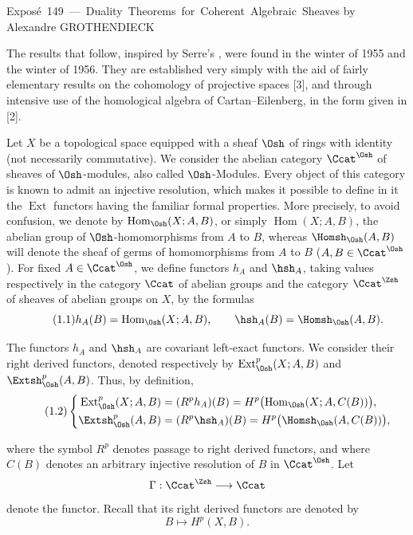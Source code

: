 \unit{Exposé 149 — Duality Theorems for Coherent Algebraic Sheaves}
%
  {by Alexandre GROTHENDIECK}

The results that follow, inspired by Serre's ,
were found in the winter of 1955 and the winter of 1956. They are established
very simply with the aid of fairly elementary results on the cohomology of
projective spaces [3], and through intensive use of the homological algebra of
Cartan--Eilenberg, in the form given in [2].


Let $X$ be a topological space equipped with a sheaf $\Osh$ of rings with
identity (not necessarily commutative). We consider the abelian category
$\Ccat^{\Osh}$ of sheaves of $\Osh$-modules, also called $\Osh$-Modules. Every
object of this category is known to admit an injective resolution, which makes
it possible to define in it the $\operatorname{Ext}$ functors having the familiar
formal properties. More precisely, to avoid confusion, we denote by
$\operatorname{Hom}_{\Osh}(X;A,B)$, or simply $\operatorname{Hom}(X;A,B)$, the
abelian group of $\Osh$-homomorphisms from $A$ to $B$, whereas
$\Homsh_{\Osh}(A,B)$ will denote the sheaf of germs of homomorphisms from $A$ to
$B$ ($A,B\in\Ccat^{\Osh}$). For fixed $A\in\Ccat^{\Osh}$, we define functors
$h_A$ and $\hsh_A$, taking values respectively in the category $\Ccat$ of
abelian groups and the category $\Ccat^{\Zsh}$ of sheaves of abelian groups on
$X$, by the formulas
\begin{equation}\tag{1.1}
  h_A(B)=\operatorname{Hom}_{\Osh}(X;A,B),
  \qquad
  \hsh_A(B)=\Homsh_{\Osh}(A,B).
\end{equation}

The functors $h_A$ and $\hsh_A$ are covariant left-exact functors. We consider
their right derived functors, denoted respectively by
$\operatorname{Ext}_{\Osh}^{p}(X;A,B)$ and $\Extsh_{\Osh}^{p}(A,B)$. Thus, by
definition,
\begin{equation}\tag{1.2}
\left\{
\begin{aligned}
\operatorname{Ext}_{\Osh}^{p}(X;A,B)
  &= (R^{p}h_A)(B)
   = H^{p}\bigl(\operatorname{Hom}_{\Osh}(X;A,C(B))\bigr),\\
\Extsh_{\Osh}^{p}(A,B)
  &= (R^{p}\hsh_A)(B)
   = H^{p}\bigl(\Homsh_{\Osh}(A,C(B))\bigr),
\end{aligned}
\right.
\end{equation}

where the symbol $R^{p}$ denotes passage to right derived functors, and where
$C(B)$ denotes an arbitrary injective resolution of $B$ in $\Ccat^{\Osh}$. Let
\[
  \Gamma:\Ccat^{\Zsh}\longrightarrow\Ccat
\]
denote the  functor. Recall that its right derived functors are
denoted by
\[
  B\longmapsto H^{p}(X,B).
\]

